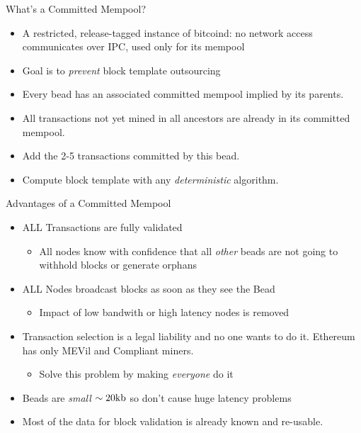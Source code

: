 \documentclass[tikz,mathserif,usenames,dvipsnames,svgnames,table]{beamer}
\newlength{\wideitemsep}
\let\olditem\item
\renewcommand{\item}{\setlength{\itemsep}{\wideitemsep}\olditem}
\begin{document}
\begin{frame}{What's a Committed Mempool?}
    \begin{itemize}
        \item A restricted, release-tagged instance of bitcoind: no network access communicates over
            IPC, used only for its mempool
        \item Goal is to {\it prevent} block template outsourcing
        \item Every bead has an associated committed mempool implied by its parents.
        \item All transactions not yet mined in all ancestors are already in its committed mempool.
        \item Add the 2-5 transactions committed by this bead.
        \item Compute block template with any {\it deterministic} algorithm.
    \end{itemize}
\end{frame}
\begin{frame}{Advantages of a Committed Mempool}
    \begin{itemize}
        \item ALL Transactions are fully validated
            \begin{itemize}
                \item[$\Rightarrow$] All nodes know with confidence that all {\it other} beads are
                    not going to withhold blocks or generate orphans
            \end{itemize}
        \item ALL Nodes broadcast blocks as soon as they see the Bead
            \begin{itemize}
                \item[$\Rightarrow$] Impact of low bandwith or high latency nodes is removed
            \end{itemize}
        \item Transaction selection is a legal liability and no one wants to do it. Ethereum has
            only MEVil and Compliant miners.
            \begin{itemize}
                \item[$\Rightarrow$] Solve this problem by making {\it everyone} do it
            \end{itemize}
        \item Beads are {\it small} $\sim 20{\rm kb}$ so don't cause huge latency problems
        \item Most of the data for block validation is already known and re-usable.
    \end{itemize}
\end{frame}
\end{document}

